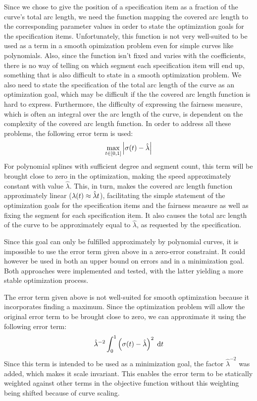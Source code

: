 \documentclass[a4paper]{article}
\begin{document}
				Since we chose to give the position of a specification item as a fraction of the curve's total arc length, we need the function mapping the covered arc length to the corresponding parameter values in order to state the optimization goals for the specification items. Unfortunately, this function is not very well-suited to be used as a term in a smooth opimization problem even for simple curves like polynomials. Also, since the function isn't fixed and varies with the coefficients, there is no way of telling on which segment each specification item will end up, something that is also difficult to state in a smooth optimization problem. We also need to state the specification of the total arc length of the curve as an optimization goal, which may be difficult if the the covered arc length function is hard to express. Furthermore, the difficulty of expressing the fairness measure, which is often an integral over the arc length of the curve, is dependent on the complexity of the covered arc length function. In order to address all these problems, the following error term is used:
				\begin{equation*}
					\max_{t \in \left[ 0,1 \right]} \left| \sigma\!\left( t \right) - \hat{\lambda} \right|
				\end{equation*}
				For polynomial splines with sufficient degree and segment count, this term will be brought close to zero in the optimization, making the speed approximately constant with value \(\hat{\lambda}\). This, in turn, makes the covered arc length function approximately linear (\(\lambda\!\left( t \right) \approx \hat{\lambda}t\)), facilitating the simple statement of the optimization goals for the specification items and the fairness measure as well as fixing the segment for each specification item. It also causes the total arc length of the curve to be approximately equal to \(\hat{\lambda}\), as requested by the specification.

				Since this goal can only be fulfilled approximately by polynomial curves, it is impossible to use the error term given above in a zero-error constraint. It could however be used in both an upper bound on errors and in a minimization goal. Both approaches were implemented and tested, with the latter yielding a more stable optimization process.

				The error term given above is not well-suited for smooth optimization because it incorporates finding a maximum. Since the optimization problem will allow the original error term to be brought close to zero, we can approximate it using the following error term:
				\begin{equation*}
					\hat{\lambda}^{-2}\int_{0}^{1} \left( \sigma\!\left( t \right) - \hat{\lambda} \right)^2 \; \mathrm{d}t
				\end{equation*}
				Since this term is intended to be used as a minimization goal, the factor \(\hat{\lambda}^{-2}\) was added, which makes it scale invariant. This enables the error term to be statically weighted against other terms in the objective function without this weighting being shifted because of curve scaling.
\end{document}
